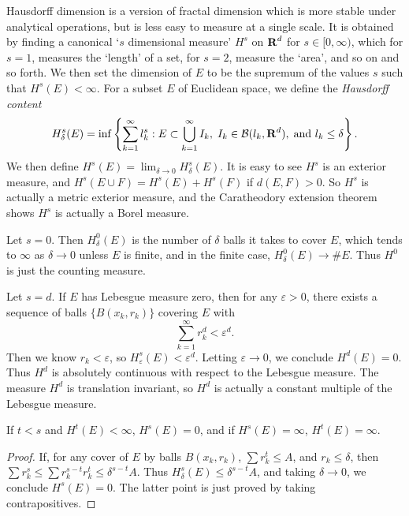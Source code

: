 Hausdorff dimension is a version of fractal dimension which is more stable under analytical operations, but is less easy to measure at a single scale. It is obtained by finding a canonical `$s$ dimensional measure' $H^s$ on $\operatorname{\mathbf{R}}^d$ for $s \in [0,\infty)$, which for $s = 1$, measures the `length' of a set, for $s = 2$, measure the `area', and so on and so forth. We then set the dimension of $E$ to be the supremum of the values $s$ such that $H^s(E) < \infty$. For a subset $E$ of Euclidean space, we define the \emph{Hausdorff content}
%
\[ H_\delta^s(E) = \inf \left\{ \sum_{k = 1}^\infty l_k^s : E \subset \bigcup_{k = 1}^\infty I_k,\; I_k \in \operatorname{\mathcal{B}}(l_k,\operatorname{\mathbf{R}}^d),\; \text{and}\ l_k \leq \delta \right\}. \]
%
We then define $H^s(E) = \lim_{\delta \to 0} H_\delta^s(E)$. It is easy to see $H^s$ is an exterior measure, and $H^s(E \cup F) = H^s(E) + H^s(F)$ if $d(E,F) > 0$. So $H^s$ is actually a metric exterior measure, and the Caratheodory extension theorem shows $H^s$ is actually a Borel measure.

\begin{example}
	Let $s = 0$. Then $H_\delta^0(E)$ is the number of $\delta$ balls it takes to cover $E$, which tends to $\infty$ as $\delta \to 0$ unless $E$ is finite, and in the finite case, $H_\delta^0(E) \to \# E$. Thus $H^0$ is just the counting measure.
\end{example}

\begin{example}
	Let $s = d$. If $E$ has Lebesgue measure zero, then for any $\varepsilon > 0$, there exists a sequence of balls $\{ B(x_k,r_k) \}$ covering $E$ with
	\[ \sum_{k = 1}^\infty r_k^d < \varepsilon^d. \]
	Then we know $r_k < \varepsilon$, so $H^s_\varepsilon(E) < \varepsilon^d$. Letting $\varepsilon \to 0$, we conclude $H^d(E) = 0$. Thus $H^d$ is absolutely continuous with respect to the Lebesgue measure. The measure $H^d$ is translation invariant, so $H^d$ is actually a constant multiple of the Lebesgue measure.
\end{example}

\begin{lemma}
	If $t < s$ and $H^t(E) < \infty$, $H^s(E) = 0$, and if $H^s(E) = \infty$, $H^t(E) = \infty$.
\end{lemma}
\begin{proof}
	If, for any cover of $E$ by balls $B(x_k,r_k)$, $\sum r_k^t \leq A$, and $r_k \leq \delta$, then $\sum r_k^s \leq \sum r_k^{s-t} r_k^t \leq \delta^{s-t} A$. Thus $H^s_\delta(E) \leq \delta^{s-t} A $, and taking $\delta \to 0$, we conclude $H^s(E) = 0$. The latter point is just proved by taking contrapositives.
\end{proof}


